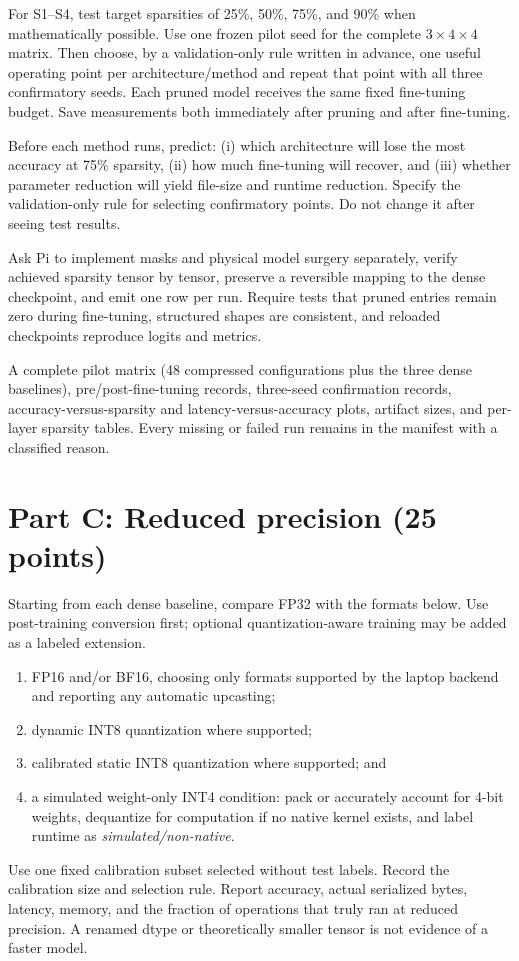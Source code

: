 \documentclass[11pt,letterpaper]{article}
\begin{document}
For S1--S4, test target sparsities of 25\%, 50\%, 75\%, and 90\% when mathematically possible. Use one frozen pilot seed for the complete $3\times4\times4$ matrix. Then choose, by a validation-only rule written in advance, one useful operating point per architecture/method and repeat that point with all three confirmatory seeds. Each pruned model receives the same fixed fine-tuning budget. Save measurements both immediately after pruning and after fine-tuning.

\begin{humanbox}
Before each method runs, predict: (i) which architecture will lose the most accuracy at 75\% sparsity, (ii) how much fine-tuning will recover, and (iii) whether parameter reduction will yield file-size and runtime reduction. Specify the validation-only rule for selecting confirmatory points. Do not change it after seeing test results.
\end{humanbox}
\begin{agentbox}
Ask Pi to implement masks and physical model surgery separately, verify achieved sparsity tensor by tensor, preserve a reversible mapping to the dense checkpoint, and emit one row per run. Require tests that pruned entries remain zero during fine-tuning, structured shapes are consistent, and reloaded checkpoints reproduce logits and metrics.
\end{agentbox}
\begin{deliver}
A complete pilot matrix (48 compressed configurations plus the three dense baselines), pre/post-fine-tuning records, three-seed confirmation records, accuracy-versus-sparsity and latency-versus-accuracy plots, artifact sizes, and per-layer sparsity tables. Every missing or failed run remains in the manifest with a classified reason.
\end{deliver}

\section{Part C: Reduced precision \texorpdfstring{\hfill}{} (25 points)}
Starting from each dense baseline, compare FP32 with the formats below. Use post-training conversion first; optional quantization-aware training may be added as a labeled extension.
\begin{enumerate}
 \item FP16 and/or BF16, choosing only formats supported by the laptop backend and reporting any automatic upcasting;
 \item dynamic INT8 quantization where supported;
 \item calibrated static INT8 quantization where supported; and
 \item a simulated weight-only INT4 condition: pack or accurately account for 4-bit weights, dequantize for computation if no native kernel exists, and label runtime as \emph{simulated/non-native}.
\end{enumerate}
Use one fixed calibration subset selected without test labels. Record the calibration size and selection rule. Report accuracy, actual serialized bytes, latency, memory, and the fraction of operations that truly ran at reduced precision. A renamed dtype or theoretically smaller tensor is not evidence of a faster model.
\end{document}
